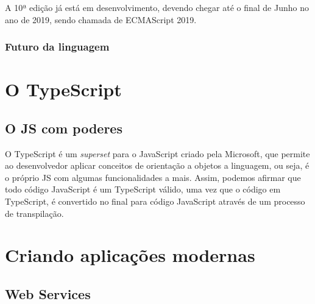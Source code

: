 \documentclass[
	12pt,				%
	openright,			%
	twoside,			%
	a4paper,			%
	english,			%
	brazil				%
	]{abntex2}
\begin{document}
A 10ª edição já está em desenvolvimento, devendo chegar até o final de Junho no ano de 2019, sendo chamada de ECMAScript 2019.

\section{Futuro da linguagem}


\part{O TypeScript}
\chapter{O JS com poderes}

O TypeScript é um \textit{superset} para o JavaScript criado pela Microsoft, que  permite ao desenvolvedor aplicar conceitos de orientação a objetos a linguagem, ou seja, é o próprio JS com algumas funcionalidades a mais. Assim, podemos afirmar que todo código JavaScript é um TypeScript válido, uma vez que o código em TypeScript, é convertido no final para código JavaScript através de um processo de transpilação.


\part{Criando aplicações modernas}
\chapter{Web Services}



\end{document}

